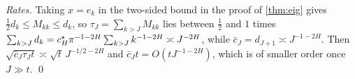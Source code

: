 \emph{Rates.} Taking $x=e_k$ in the two-sided bound in the proof of \cref{thm:eig} gives $\frac12d_k\le M_{kk}\le d_k$, so
$\tau_J=\sum_{k>J}M_{kk}$ lies between $\frac12$ and $1$ times $\sum_{k>J}d_k=c^{\star}_H\pi^{-1-2H}\sum_{k>J}k^{-1-2H}\asymp J^{-2H}$,
while $\bar c_J=d_{J+1}\asymp J^{-1-2H}$. Then $\sqrt{\bar c_J\tau_Jt}\asymp\sqrt t\,J^{-1/2-2H}$ and
$\bar c_Jt=O(tJ^{-1-2H})$, which is of smaller order once $J\gg t$. \qed
